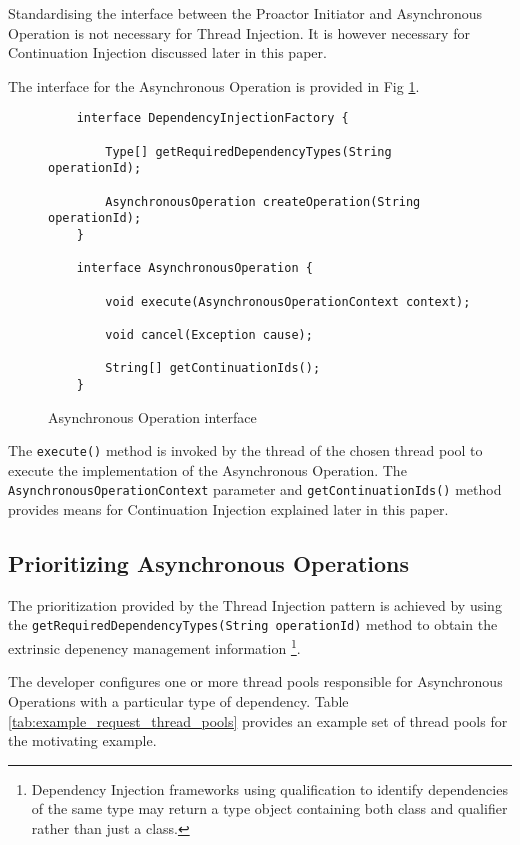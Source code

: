 \documentclass{article}
\begin{document}
Standardising the interface between the Proactor Initiator and Asynchronous
Operation is not necessary for Thread Injection.  It is however necessary for
Continuation Injection discussed later in this paper.

The interface for the Asynchronous Operation is provided in Fig
\ref{fig:AO_interface_AOP}.

\begin{figure}[!t]
\begin{verbatim}
    interface DependencyInjectionFactory {
    
        Type[] getRequiredDependencyTypes(String operationId);
        
        AsynchronousOperation createOperation(String operationId);
    }

    interface AsynchronousOperation {
    
        void execute(AsynchronousOperationContext context);
        
        void cancel(Exception cause);
        
        String[] getContinuationIds();
    }
\end{verbatim}
\caption[Caption for Code]{Asynchronous Operation interface}
\label{fig:AO_interface_AOP}
\end{figure}

The \texttt{execute()} method is invoked by the thread of the chosen thread pool
to execute the implementation of the Asynchronous Operation.  The
\texttt{AsynchronousOperationContext} parameter and \texttt{getContinuationIds()}
method provides means for Continuation Injection explained later in this paper.


\subsection{Prioritizing Asynchronous Operations}

The prioritization provided by the Thread Injection pattern is achieved by using
the \texttt{getRequiredDependencyTypes(String operationId)} method to obtain the
extrinsic depenency management information \footnote{Dependency Injection
frameworks using qualification to identify dependencies of the same type may
return a type object containing both class and qualifier rather than just a
class.}.

The developer configures one or more thread pools responsible for Asynchronous
Operations with a particular type of dependency. Table
\ref{tab:example_request_thread_pools} provides an example set of thread pools
for the motivating example.
\end{document}
